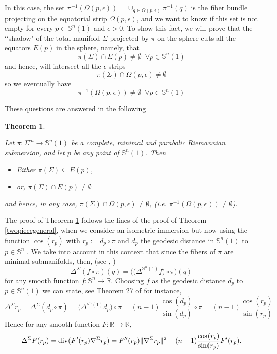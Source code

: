 \documentclass[11pt,letterpaper]{amsart}
\newtheorem{theorem}{Theorem}[section]
\theoremstyle{definition}
\theoremstyle{remark}
\newcommand{\ese}{\mathbb{S}}
\begin{document}
In this case, the set   $\pi^{-1}(\Omega(p,\epsilon))=\cup_{q \in \Omega(p,\epsilon)} \pi^{-1}(q) $ is the fiber bundle projecting on the equatorial strip $ \Omega(p,\epsilon)$, and we want to know if this set is not empty for every $p \in \ese^n(1)$ and $\epsilon >0$. To show this fact, we will prove that the \lq\lq shadow" of the total manifold $\Sigma$ projected by $\pi$ on the sphere cuts all the equators $E(p)$ in the sphere, namely, that
 $$\pi(\Sigma) \cap E(p) \neq \emptyset\,\,\,\forall p \in \mathbb{S}^n(1)$$ and hence, will intersect all the $\epsilon$-strips
        $$\pi(\Sigma) \cap \Omega(p,\epsilon) \neq \emptyset$$
        \noindent so we eventually have  
        $$\pi^{-1}(\Omega(p,\epsilon))\neq \emptyset\,\,\,\forall p \in \mathbb{S}^n(1)$$
   
These questions are answered in the following

\begin{theorem}\label{twopiecegeneralsub}

Let $\pi:\Sigma^m \to \mathbb{S}^n(1)$ be a complete, minimal and parabolic Riemannian submersion, and let $p$ be any point of $\mathbb{S}^n(1)$.  Then
    \begin{itemize}
        \item Either $\pi(\Sigma)\subseteq E(p)$, 
        \item or, $\pi(\Sigma)\cap E(p)\neq \emptyset$
            \end{itemize}
            and  hence, in any case,  $\pi(\Sigma) \cap \Omega(p,\epsilon) \neq \emptyset$, (i.e. $\pi^{-1}(\Omega(p,\epsilon))\neq \emptyset$).
\end{theorem}
The proof of Theorem \ref{twopiecegeneralsub} follows the lines of the proof of Theorem \ref{twopiecegeneral},  when we consider an isometric immersion but now using the function $\cos(r_p)$ with $r_p:=d_p \circ \pi$ and $d_p$ the geodesic distance in $\mathbb{S}^n(1)$ to $p\in \mathbb{S}^n$ . We take into account in this context that since the fibers of $\pi$ are minimal submanifolds, then, (see \cite{W}, \cite{GP})
$$\Delta^\Sigma(f\circ \pi)(q)=\bigg(\big(\Delta^{\ese^n(1)}f\big)\circ\pi\bigg)(q)$$
  for any smooth function $f:\mathbb{S}^n\to \mathbb{R}$. Choosing $f$ as the geodesic distance $d_p$ to $p\in \mathbb{S}^n(1)$ we can state, see Theorem 27 of \cite{Petersen} for instance, 
  $$
  \Delta^\Sigma r_p=\Delta^\Sigma (d_p\circ \pi)=\big(\Delta^{\ese^n(1)}d_p\big)\circ \pi=(n-1)\frac{\cos(d_p)}{\sin(d_p)}\circ \pi=(n-1)\frac{\cos(r_p)}{\sin(r_p)}
  $$
  Hence for any smooth function $F:\mathbb {R}\to \mathbb{R}$,
  $$
\Delta^\Sigma F(r_p)={\rm div }(F'(r_p)\nabla^\Sigma r_p)=F''(r_p)\Vert \nabla^\Sigma r_p\Vert^2+ (n-1)\frac{\cos(r_p)}{\sin(r_p)} F'(r_p).
$$
  
\end{document}
